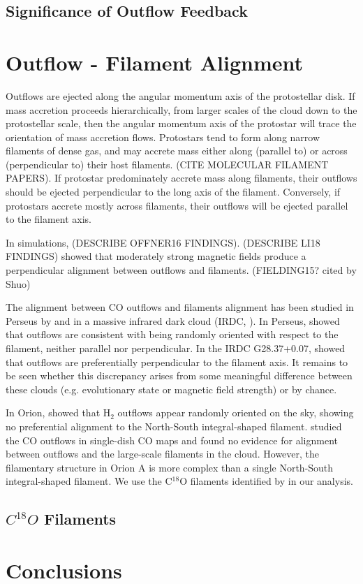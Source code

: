\documentclass[twocolumn]{aastex62}
\begin{document}
\subsection{Significance of Outflow Feedback }



\section{Outflow - Filament Alignment}
Outflows are ejected along the angular momentum axis of the protostellar disk. If mass accretion proceeds hierarchically, from larger scales of the cloud down to the protostellar scale, then the angular momentum axis of the protostar will trace the orientation of mass accretion flows. Protostars tend to form along narrow filaments of dense gas, and may accrete mass either along (parallel to) or across (perpendicular to) their host filaments. (CITE MOLECULAR FILAMENT PAPERS). If protostar predominately accrete mass along filaments, their outflows should be ejected perpendicular to the long axis of the filament. Conversely, if protostars accrete mostly across filaments, their outflows will be ejected parallel to the filament axis. 


In simulations, \citet{Offner16} (DESCRIBE OFFNER16 FINDINGS). \citet{Li18} (DESCRIBE LI18 FINDINGS) showed that moderately strong magnetic fields produce a perpendicular alignment between outflows and filaments.  (FIELDING15? cited by Shuo)

The alignment between CO outflows  and filaments alignment has been studied in Perseus by \citet{Stephens17} and in a massive infrared dark cloud (IRDC, \citealp{Kong19}). In Perseus, \citet{Stephens17} showed that outflows are consistent with being randomly oriented with respect to the filament, neither parallel nor perpendicular. In the IRDC G28.37+0.07, \cite{Kong19} showed that outflows are preferentially perpendicular to the filament axis. It remains to be seen whether this discrepancy arises from some meaningful difference between these clouds (e.g. evolutionary state or magnetic field strength) or by chance. 

In Orion, \citet{Davis09} showed that H$_{2}$ outflows appear randomly oriented on the sky, showing no preferential alignment to the North-South integral-shaped filament. \citet{Tanabe19} studied the CO outflows in single-dish CO maps and found no evidence for alignment between outflows and the large-scale filaments in the cloud. However, the filamentary structure in Orion A is more complex than a single North-South integral-shaped filament. We use the C$^{18}$O filaments identified by \citet{Suri19} in our analysis.

\subsection{$C^{18}O$ Filaments}





\section{Conclusions}



\end{document}
